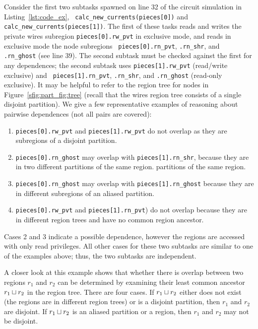 Consider the first two subtasks spawned on line 32 of the circuit
simulation in Listing~\ref{lst:code_ex}, {\tt
calc\_new\_currents(pieces[0])} and {\tt
calc\_new\_currents(pieces[1])}.  The first of these tasks reads and
writes the private wires subregion {\tt pieces[0].rw\_pvt} in
exclusive mode, and reads in exclusive mode the node subregions {\tt
pieces[0].rn\_pvt}, {\tt .rn\_shr}, and {\tt
.rn\_ghost} (see line 39).  The second subtask must be
checked against the first for any dependences; the second subtask uses
{\tt pieces[1].rw\_pvt} (read/write exclusive) and {\tt
pieces[1].rn\_pvt}, {\tt .rn\_shr}, and {\tt .rn\_ghost} (read-only exclusive).
It may be helpful to refer to the region tree for nodes in Figure~\ref{sfig:part_fig:tree} (recall that the wires region tree consists of a single disjoint partition).  We give a few representative examples
of reasoning about pairwise dependences (not all pairs are covered):
\begin{enumerate}
\item {\tt pieces[0].rw\_pvt} and {\tt pieces[1].rw\_pvt} do not overlap as they are subregions of a disjoint partition.
\item {\tt pieces[0].rn\_ghost} may overlap with {\tt pieces[1].rn\_shr}, because they are in two different
  partitions of the same region.
  partitions of the same region.
\item {\tt pieces[0].rn\_ghost} may overlap with {\tt pieces[1].rn\_ghost} because they are in different subregions of
an aliased partition.
\item {\tt pieces[0].rw\_pvt} and {\tt pieces[1].rn\_pvt})
do not overlap because they are in different region trees and have no common region ancestor.
\end{enumerate}
Cases 2 and 3 indicate a possible dependence, however the regions are
accessed with only read privileges. All other cases for these two
subtasks are similar to one of the examples above; thus, the two
subtasks are independent.

A closer look at this example shows that whether there is overlap
between two regions $r_1$ and $r_2$ can be determined by examining
their least common ancestor $r_1 \sqcup r_2$ in the region tree.  
There are four cases.  If $r_1 \sqcup r_2$ either does not exist (the regions
are in different region trees) or is a disjoint partition, then $r_1$
and $r_2$ are disjoint.  If $r_1 \sqcup r_2$ is an
aliased partition or a region, 
then $r_1$ and $r_2$ may not be disjoint.

